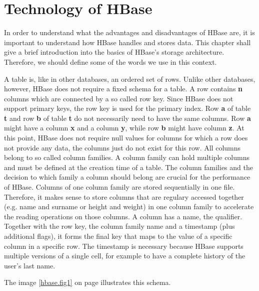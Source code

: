 
\section{Technology of HBase}
\label{lblHBaseTechnologies}

In order to understand what the advantages and disadvantages of HBase are, it is important to understand how HBase handles and stores data.
This chapter shall give a brief introduction into the basics of HBase's storage architecture. Therefore, we should define some of the words
we use in this context.

A table is, like in other databases, an ordered set of rows. Unlike other databases, however, HBase does not require a fixed schema for a table.
A row contains \textbf{n} columns which are connected by a so called row key. Since HBase does not support primary keys, the row key is used for the primary
index. Row \textbf{a} of table \textbf{t }and row \textbf{b} of table \textbf{t} do not necessarily need to have the same columns. Row \textbf{a} might have a column \textbf{x} and a column \textbf{y}, while
row \textbf{b} might have column \textbf{z}. At this point, HBase does not require null values for columns for which a row does not provide any data, the columns
just do not exist for this row. \cite{hbase.george.2011}
All columns belong to so called column families. A column family can hold multiple columns and must be defined at the creation time of a table.
The column families and the decision to which family a column should belong are crucial for the performance of HBase. Columns of one column family
are stored sequentially in one file. Therefore, it makes sense to store columns that are regulary accessed together (e.g. name and surname or height and weight)
in one column family to accelerate the reading operations on those columns. \cite{hbase.george.2011}
A column has a name, the qualifier. Together with the row key, the column family name and a timestamp (plus additional flags), it forms the
final key that maps to the value of a specific column in a specific row. The timestamp is necessary because HBase supports multiple versions of a single cell, for example
to have a complete history of the user's last name. \cite{hbase.bertozzi.2012} \cite{hbase.george.2011}

The image \ref{hbase.fig1} on page \pageref{hbase.fig1} illustrates this schema.

